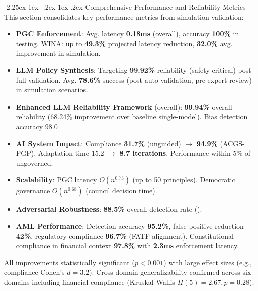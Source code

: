 \documentclass[manuscript,screen,9pt]{acmart}
\makeatletter
\renewcommand\subsection{\@startsection{subsection}{2}{\z@}%
  {-2.25ex\@plus -1ex \@minus -.2ex}%
  {1ex \@plus .2ex}%
  {\normalfont\large\bfseries}}
\makeatother
\begin{document}
\subsection{Comprehensive Performance and Reliability Metrics}
\label{subsec:comprehensive_performance_analysis}
This section consolidates key performance metrics from simulation validation:
\begin{itemize}[leftmargin=*,itemsep=1pt,parsep=1pt]
	\item \textbf{PGC Enforcement}: Avg. latency \textbf{0.18ms} (overall), accuracy \textbf{100\%} in testing. WINA: up to \textbf{49.3\%} projected latency reduction, \textbf{32.0\%} avg. improvement in simulation.
	\item \textbf{LLM Policy Synthesis}: Targeting \textbf{99.92\%} reliability (safety-critical) post-full validation. Avg. \textbf{78.6\%} success (post-auto validation, pre-expert review) in simulation scenarios.
	\item \textbf{Enhanced LLM Reliability Framework} (overall): \textbf{99.94\%} overall reliability (68.24\% improvement over baseline single-model). Bias detection accuracy 98.0%
	\item \textbf{AI System Impact}: Compliance \textbf{31.7\%} (unguided) $\rightarrow$ \textbf{94.9\%} (ACGS-PGP). Adaptation time 15.2 $\rightarrow$ \textbf{8.7 iterations}. Performance within 5\% of ungoverned.
	\item \textbf{Scalability}: PGC latency $O(n^{0.73})$ (up to 50 principles). Democratic governance $O(n^{0.68})$ (council decision time).
	\item \textbf{Adversarial Robustness}: \textbf{88.5\%} overall detection rate ().
	\item \textbf{AML Performance}: Detection accuracy \textbf{95.2\%}, false positive reduction \textbf{42\%}, regulatory compliance \textbf{96.7\%} (FATF alignment). Constitutional compliance in financial context \textbf{97.8\%} with \textbf{2.3ms} enforcement latency.
\end{itemize}
All improvements statistically significant ($p < 0.001$) with large effect sizes (e.g., compliance Cohen's $d = 3.2$). Cross-domain generalizability confirmed across six domains including financial compliance (Kruskal-Wallis $H(5) = 2.67, p = 0.28$).
\end{document}
